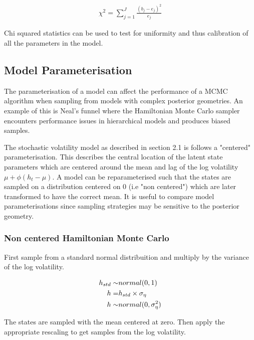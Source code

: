 \documentclass[12pt, a4paper]{article}
\begin{document}
        $$
        \begin{aligned}
        \chi^2 = \sum_{j=1}^J \frac{(b_{j} - e_{j})^2}{e_j}
        \end{aligned}
        $$
    
        Chi squared statistics can be used to test for uniformity and thus calibration of all the parameters in the model.
    
    \subsection{Model Parameterisation}

        The parameterisation of a model can affect the performance of a MCMC algorithm when sampling from models with complex posterior geometries. An example of this is Neal's funnel \citep{neal2003slice} where the Hamiltonian Monte Carlo sampler encounters performance issues in hierarchical models and produces biased samples. 

        The stochastic volatility model as described in section 2.1 is follows a "centered" parameterisation. This describes the central location of the latent state parameters which are centered around the mean and lag of the log volatility $\mu +\phi(h_t - \mu)$. A model can be reparameterised such that the states are sampled on a distribution centered on 0 (i.e "non centered") which are later transformed to have the correct mean.  It is useful to compare model parameterisations since sampling strategies may be sensitive to the posterior geometry. 
        
        \subsubsection{Non centered Hamiltonian Monte Carlo}
        First sample from a standard normal distribuition and multiply by the variance of the log volatility.

        $$
        \begin{aligned}
        h_{std} \sim& \space normal(0,1) \\
        h =& h_{std} \times \sigma_{\eta} \\ 
        h \sim& normal(0, \sigma_{\eta}^2)
        \end{aligned}
        $$
        
        The states are sampled with the mean centered at zero. Then apply the appropriate rescaling to get samples from the log volatility. 
        
\end{document}
